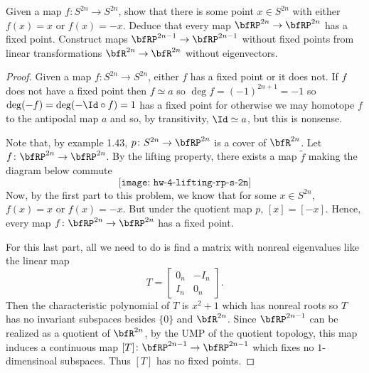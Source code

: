 \begin{problem}[Hatcher {\S}2.2, Ex.\@ 2]
Given a map $f\colon S^{2n}\to S^{2n}$, show that there is some point $x\in
S^{2n}$ with either $f(x)=x$ or $f(x)=-x$. Deduce that every map
$\bfRP^{2n}\to\bfRP^{2n}$ has a fixed point. Construct maps
$\bfRP^{2n-1}\to\bfRP^{2n-1}$ without fixed points from linear
transformations $\bfR^{2n}\to\bfR^{2n}$ without eigenvectors.
\end{problem}
\begin{proof}
Given a map $f\colon S^{2n}\to S^{2n}$, either $f$ has a fixed point or it
does not. If $f$ does not have a fixed point then $f\simeq a$ so $\deg
f=(-1)^{2n+1}=-1$ so $\deg(-f)=\deg(-\Id\circ f)=1$ has a fixed point for
otherwise we may homotope $f$  to the antipodal map $a$ and so, by
transitivity, $\Id\simeq a$, but this is nonsense.

Note that, by example 1.43, $p\colon S^{2n}\to\bfRP^{2n}$ is a cover of
$\bfR^{2n}$. Let $f\colon\bfRP^{2n}\to\bfRP^{2n}$. By the lifting property,
there exists a map $\tilde f$ making the diagram below commute
\begin{equation}
\label{eq:commutative-lifting-property}
\texttt{[image: hw-4-lifting-rp-s-2n]}
\end{equation}
Now, by the first part to this problem, we know that for some $x\in
S^{2n}$, $f(x)=x$ or $f(x)=-x$. But under the quotient map $p$,
$[x]=[-x]$. Hence, every map $f\colon\bfRP^{2n}\to\bfRP^{2n}$ has a fixed
point.

For this last part, all we need to do is find a matrix with nonreal
eigenvalues like the linear map
\begin{equation}
\label{eq:linear-map-with-complex-eigenvalues}
T=
\begin{bmatrix}
0_n&-I_n\\
I_n&0_n
\end{bmatrix}.
\end{equation}
Then the characteristic polynomial of $T$ is $x^2+1$ which has nonreal
roots so $T$ has no invariant subspaces besides $\{0\}$ and
$\bfR^{2n}$. Since $\bfRP^{2n-1}$ can be realized as a quotient of
$\bfR^{2n}$, by the UMP of the quotient topology, this map induces a
continuous map $[T]\colon\bfRP^{2n-1}\to\bfRP^{2n-1}$ which fixes no
$1$-dimensinoal subspaces. Thus $[T]$ has no fixed points.
\end{proof}

